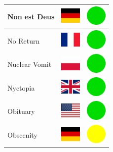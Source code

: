 \documentclass[12pt, a4paper, twoside]{report}
\begin{document}
\begin{center}
\begin{longtable}{|p{5cm}|p{2cm}|p{2cm}|}
 Non est Deus                                               & \includegraphics[width=1cm]{../4x3/de} &   \includegraphics[width=1cm]{../likes/y} \\ \hline
 No Return                                                  & \includegraphics[width=1cm]{../4x3/fr} &   \includegraphics[width=1cm]{../likes/y} \\ \hline
 Nuclear Vomit                                              & \includegraphics[width=1cm]{../4x3/pl} &   \includegraphics[width=1cm]{../likes/y} \\ \hline
 Nyctopia                                                   & \includegraphics[width=1cm]{../4x3/gb} &   \includegraphics[width=1cm]{../likes/y} \\ \hline
 Obituary                                                   & \includegraphics[width=1cm]{../4x3/us} &   \includegraphics[width=1cm]{../likes/y} \\ \hline
 Obscenity                                                  & \includegraphics[width=1cm]{../4x3/de} &   \includegraphics[width=1cm]{../likes/m} \\ \hline

\end{longtable}
\end{center}
\end{document}
